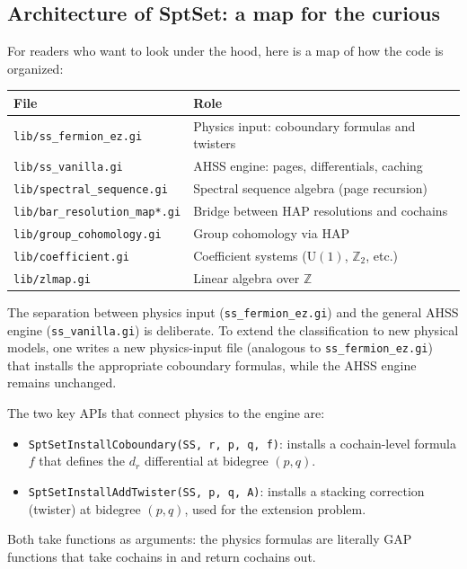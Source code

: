 \documentclass{SciPost}
\theoremstyle{definition}
\newcommand{\Z}{\mathbb{Z}}
\newcommand{\Zt}{\mathbb{Z}_2}
\newcommand{\U}{\mathrm{U}}
\begin{document}
\subsection{Architecture of SptSet: a map for the curious}
\label{subsec:architecture}

For readers who want to look under the hood, here is a map of how the code is organized:

\begin{center}
\renewcommand{\arraystretch}{1.3}
\begin{tabular}{ll}
\toprule
\textbf{File} & \textbf{Role} \\
\midrule
\texttt{lib/ss\_fermion\_ez.gi} & Physics input: coboundary formulas and twisters \\
\texttt{lib/ss\_vanilla.gi} & AHSS engine: pages, differentials, caching \\
\texttt{lib/spectral\_sequence.gi} & Spectral sequence algebra (page recursion) \\
\texttt{lib/bar\_resolution\_map*.gi} & Bridge between HAP resolutions and cochains \\
\texttt{lib/group\_cohomology.gi} & Group cohomology via HAP \\
\texttt{lib/coefficient.gi} & Coefficient systems ($\U(1)$, $\Zt$, etc.) \\
\texttt{lib/zlmap.gi} & Linear algebra over $\Z$ \\
\bottomrule
\end{tabular}
\end{center}

The separation between physics input (\texttt{ss\_fermion\_ez.gi}) and the general AHSS engine (\texttt{ss\_vanilla.gi}) is deliberate.
To extend the classification to new physical models, one writes a new physics-input file (analogous to \texttt{ss\_fermion\_ez.gi}) that installs the appropriate coboundary formulas, while the AHSS engine remains unchanged.

The two key APIs that connect physics to the engine are:
\begin{itemize}
    \item \texttt{SptSetInstallCoboundary(SS, r, p, q, f)}: installs a cochain-level formula $f$ that defines the $d_r$ differential at bidegree $(p,q)$.
    \item \texttt{SptSetInstallAddTwister(SS, p, q, A)}: installs a stacking correction (twister) at bidegree $(p,q)$, used for the extension problem.
\end{itemize}
Both take functions as arguments: the physics formulas are literally GAP functions that take cochains in and return cochains out.
\end{document}
